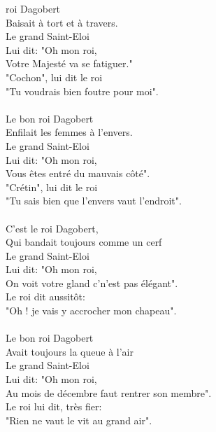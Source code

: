 
 roi Dagobert
\\Baisait à tort et à travers.
\\Le grand Saint-Eloi
\\Lui dit: "Oh mon roi,
\\Votre Majesté va se fatiguer."
\\"Cochon", lui dit le roi
\\"Tu voudrais bien foutre pour moi".
\\\\Le bon roi Dagobert
\\Enfilait les femmes à l'envers.
\\Le grand Saint-Eloi
\\Lui dit: "Oh mon roi,
\\Vous êtes entré du mauvais côté".
\\"Crétin", lui dit le roi
\\"Tu sais bien que l'envers vaut l'endroit".
\\\\C'est le roi Dagobert,
\\Qui bandait toujours comme un cerf
\\Le grand Saint-Eloi
\\Lui dit: "Oh mon roi,
\\On voit votre gland c'n'est pas élégant".
\\Le roi dit aussitôt:
\\"Oh ! je vais y accrocher mon chapeau".
\\\\Le bon roi Dagobert
\\Avait toujours la queue à l'air
\\Le grand Saint-Eloi
\\Lui dit: "Oh mon roi,
\\Au mois de décembre faut rentrer son membre".
\\Le roi lui dit, très fier:
\\"Rien ne vaut le vit au grand air".
